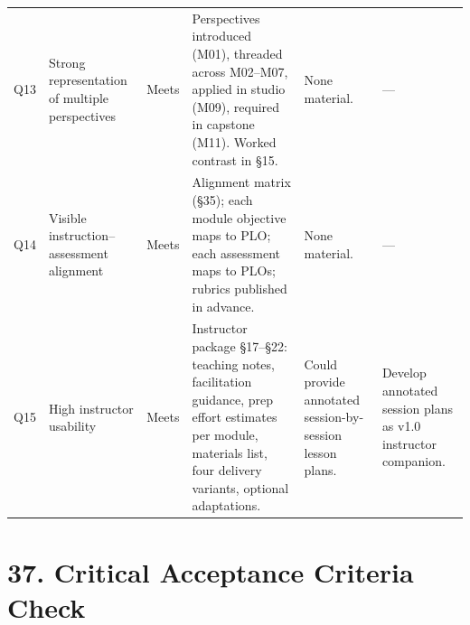 \documentclass[11pt,letterpaper,oneside]{report}
\begin{document}
\begin{landscape}
\begin{longtable}{@{}R{0.65cm} R{3.85cm} R{1.45cm} R{4.25cm} R{3.55cm} R{4.30cm}@{}}
Q13 & Strong representation of multiple perspectives
    & Meets
    & Perspectives introduced (M01), threaded across M02--M07, applied in studio (M09), required in capstone (M11). Worked contrast in \S15.
    & None material.
    & --- \\

Q14 & Visible instruction--assessment alignment
    & Meets
    & Alignment matrix (\S35); each module objective maps to PLO; each assessment maps to PLOs; rubrics published in advance.
    & None material.
    & --- \\

Q15 & High instructor usability
    & Meets
    & Instructor package \S17--\S22: teaching notes, facilitation guidance, prep effort estimates per module, materials list, four delivery variants, optional adaptations.
    & Could provide annotated session-by-session lesson plans.
    & Develop annotated session plans as v1.0 instructor companion. \\

\end{longtable}
\end{landscape}

\section*{37. Critical Acceptance Criteria Check}
\end{document}
